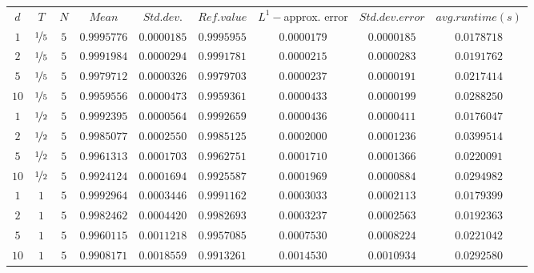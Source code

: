 \begin{tabular}{ccccccccc}
$d$ & $T$ & $N$ & $Mean$ & $Std. dev.$ & $Ref. value$ & $L^1-$approx. error & $Std. dev. error$ & $avg. runtime (s)$\\
$1$ & $\nicefrac{1}{5}$ & $5$ & $0.9995776$ & $0.0000185$ & $0.9995955$ & $0.0000179$ & $0.0000185$ & $0.0178718$\\
$2$ & $\nicefrac{1}{5}$ & $5$ & $0.9991984$ & $0.0000294$ & $0.9991781$ & $0.0000215$ & $0.0000283$ & $0.0191762$\\
$5$ & $\nicefrac{1}{5}$ & $5$ & $0.9979712$ & $0.0000326$ & $0.9979703$ & $0.0000237$ & $0.0000191$ & $0.0217414$\\
$10$ & $\nicefrac{1}{5}$ & $5$ & $0.9959556$ & $0.0000473$ & $0.9959361$ & $0.0000433$ & $0.0000199$ & $0.0288250$\\
$1$ & $\nicefrac{1}{2}$ & $5$ & $0.9992395$ & $0.0000564$ & $0.9992659$ & $0.0000436$ & $0.0000411$ & $0.0176047$\\
$2$ & $\nicefrac{1}{2}$ & $5$ & $0.9985077$ & $0.0002550$ & $0.9985125$ & $0.0002000$ & $0.0001236$ & $0.0399514$\\
$5$ & $\nicefrac{1}{2}$ & $5$ & $0.9961313$ & $0.0001703$ & $0.9962751$ & $0.0001710$ & $0.0001366$ & $0.0220091$\\
$10$ & $\nicefrac{1}{2}$ & $5$ & $0.9924124$ & $0.0001694$ & $0.9925587$ & $0.0001969$ & $0.0000884$ & $0.0294982$\\
$1$ & $1$ & $5$ & $0.9992964$ & $0.0003446$ & $0.9991162$ & $0.0003033$ & $0.0002113$ & $0.0179399$\\
$2$ & $1$ & $5$ & $0.9982462$ & $0.0004420$ & $0.9982693$ & $0.0003237$ & $0.0002563$ & $0.0192363$\\
$5$ & $1$ & $5$ & $0.9960115$ & $0.0011218$ & $0.9957085$ & $0.0007530$ & $0.0008224$ & $0.0221042$\\
$10$ & $1$ & $5$ & $0.9908171$ & $0.0018559$ & $0.9913261$ & $0.0014530$ & $0.0010934$ & $0.0292580$\\
\end{tabular}
